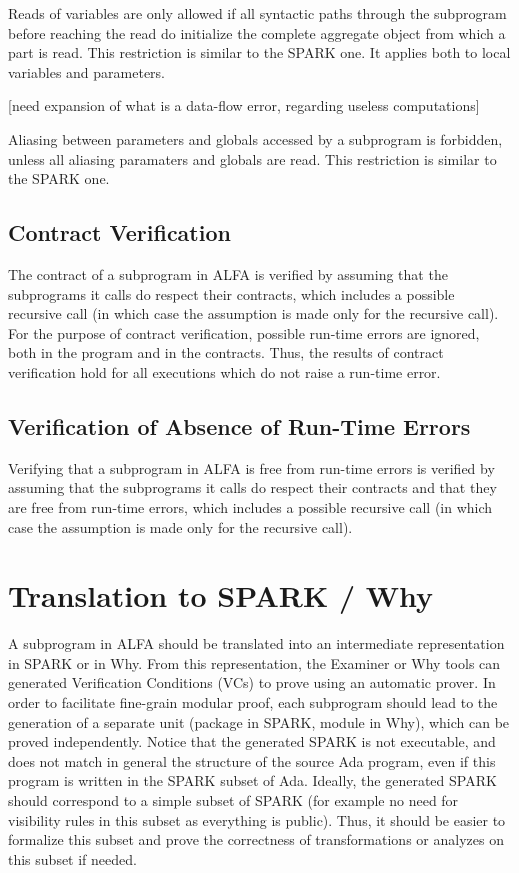 \documentclass[fullpage]{article}
\newcounter{example}
\begin{document}
Reads of variables are only allowed if all syntactic paths through the
subprogram before reaching the read do initialize the complete aggregate object
from which a part is read. This restriction is similar to the SPARK one. It
applies both to local variables and parameters.

[need expansion of what is a data-flow error, regarding useless computations]

Aliasing between parameters and globals accessed by a subprogram is forbidden,
unless all aliasing paramaters and globals are read. This restriction is
similar to the SPARK one.

\subsection{Contract Verification}

The contract of a subprogram in ALFA is verified by assuming that the
subprograms it calls do respect their contracts, which includes a possible
recursive call (in which case the assumption is made only for the recursive
call). For the purpose of contract verification, possible run-time errors are
ignored, both in the program and in the contracts. Thus, the results of
contract verification hold for all executions which do not raise a run-time
error.

\subsection{Verification of Absence of Run-Time Errors}

Verifying that a subprogram in ALFA is free from run-time errors is verified by
assuming that the subprograms it calls do respect their contracts and that they
are free from run-time errors, which includes a possible recursive call (in
which case the assumption is made only for the recursive call).

\section{Translation to SPARK / Why}

A subprogram in ALFA should be translated into an intermediate representation
in SPARK or in Why. From this representation, the Examiner or Why tools can
generated Verification Conditions (VCs) to prove using an automatic prover.  In
order to facilitate fine-grain modular proof, each subprogram should lead to
the generation of a separate unit (package in SPARK, module in Why), which can
be proved independently. Notice that the generated SPARK is not executable, and
does not match in general the structure of the source Ada program, even if this
program is written in the SPARK subset of Ada. Ideally, the generated SPARK
should correspond to a simple subset of SPARK (for example no need for
visibility rules in this subset as everything is public). Thus, it should be
easier to formalize this subset and prove the correctness of transformations or
analyzes on this subset if needed.
\end{document}
